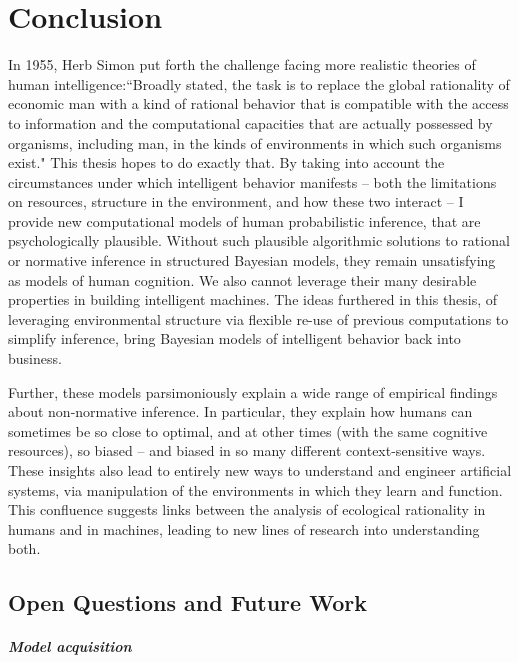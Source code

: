\chapter{Conclusion}
\label{chap:conclusion}

In 1955, Herb Simon put forth the challenge facing more realistic theories of human intelligence:``Broadly stated, the task is to replace the global rationality of economic man with a kind of rational behavior that is compatible with the access to information and the computational capacities that are actually possessed by organisms, including man, in the kinds of environments in which such organisms exist." This thesis hopes to do exactly that. By taking into account the circumstances under which intelligent behavior manifests -- both the limitations on resources, structure in the environment, and how these two interact -- I provide new computational models of human probabilistic inference, that are psychologically plausible. Without such plausible algorithmic solutions to rational or normative inference in structured Bayesian models, they remain unsatisfying as models of human cognition. We also cannot leverage their many desirable properties in building intelligent machines. The ideas furthered in this thesis, of leveraging environmental structure via flexible re-use of previous computations to simplify inference, bring Bayesian models of intelligent behavior back into business.

Further, these models parsimoniously explain a wide range of empirical findings about non-normative inference. In particular, they explain how humans can sometimes be so close to optimal, and at other times (with the same cognitive resources), so biased -- and biased in so many different context-sensitive ways. These insights also lead to entirely new ways to understand and engineer artificial systems, via manipulation of the environments in which they learn and function. This confluence suggests links between the analysis of ecological rationality in humans and in machines, leading to new lines of research into understanding both.

\section*{Open Questions and Future Work}

\paragraph{Model acquisition}

